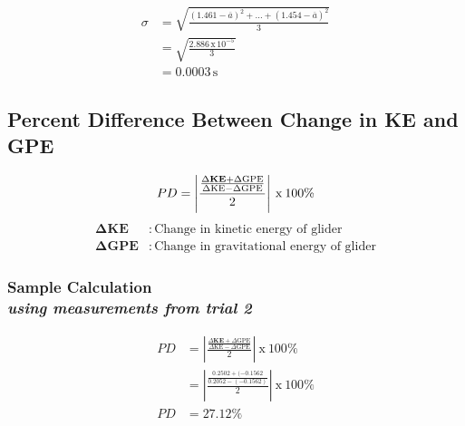 \begin{align*}
	\sigma &= \sqrt{\frac{(1.461-\overline{a})^2 + ... + (1.454-\overline{a})^2}{3}} \\
				 &= \sqrt{\frac{2.886\,\text{x}\,10^{-5}}{3}} \\
		 &= \boxed{0.0003\, \text{s}}
\end{align*}

\subsection{Percent Difference Between Change in KE and GPE}
\vspace{0.5cm}
\begin{equation}
	PD = \left| {\frac{\frac{\Delta{\textbf{KE}} + \Delta{\text{GPE}}}{\Delta{\text{KE}} - \Delta{\text{GPE}}}}{2}} \right|\: \text{x}\: 100\% \\ \\
	\label{eq:pdiff}
\end{equation}
\begin{align*}
	\boldsymbol{\Delta{\textbf{KE}}} &:\, \text{Change in kinetic energy of glider} \\
	\boldsymbol{\Delta{\textbf{GPE}}} &:\, \text{Change in gravitational energy of glider} 
\end{align*}

\subsubsection{Sample Calculation \\ {\normalfont \small\textit{using measurements from trial 2}}}

\begin{align*}
	PD &= \left| {\frac{\frac{\Delta{\textbf{KE}} + \Delta{\text{GPE}}}{\Delta{\text{KE}} - \Delta{\text{GPE}}}}{2}} \right|\: \text{x}\: 100\% \\
	 &= \left| {\frac{\frac{0.2502 + (-0.1562}{0.2052 - (-0.1562)}}{2}} \right|\: \text{x}\: 100\% \\
			PD &= \boxed{27.12\%} 
\end{align*}

